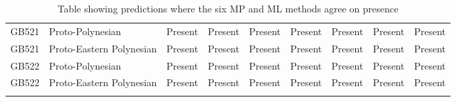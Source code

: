 \begin{longtable}{p{1.5cm}p{2.5cm}p{2.5cm}p{2.5cm}p{2.5cm}p{2.5cm}p{2.5cm}p{2.5cm}p{2.5cm}}
  GB521 & Proto-Polynesian & Present & Present & Present & Present & Present & Present & Present \\ 
  GB521 & Proto-Eastern Polynesian & Present & Present & Present & Present & Present & Present & Present \\ 
  GB522 & Proto-Polynesian & Present & Present & Present & Present & Present & Present & Present \\ 
  GB522 & Proto-Eastern Polynesian & Present & Present & Present & Present & Present & Present & Present \\ 
   \bottomrule
\caption{Table showing predictions where the six MP and ML methods agree on presence} 
\label{extra_predictions_table}
\end{longtable}
